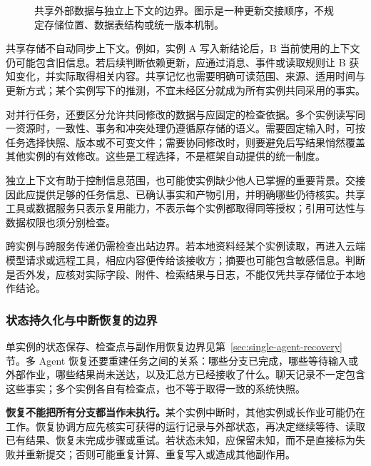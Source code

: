 \documentclass[11pt,a4paper]{article}
\begin{document}
\begin{figure}[H]
\caption{共享外部数据与独立上下文的边界。图示是一种更新交接顺序，不规定存储位置、数据表结构或统一版本机制。}
\label{fig:shared-data-contexts}
\end{figure}

共享存储不自动同步上下文。例如，实例 A 写入新结论后，B 当前使用的上下文仍可能包含旧信息。若后续判断依赖更新，应通过消息、事件或读取规则让 B 获知变化，并实际取得相关内容。共享记忆也需要明确可读范围、来源、适用时间与更新方式；某个实例写下的推测，不宜未经区分就成为所有实例共同采用的事实。


对并行任务，还要区分允许共同修改的数据与应固定的检查依据。多个实例读写同一资源时，一致性、事务和冲突处理仍遵循原存储的语义。需要固定输入时，可按任务选择快照、版本或不可变文件；需要协同修改时，则要避免后写结果悄然覆盖其他实例的有效修改。这些是工程选择，不是框架自动提供的统一制度。

独立上下文有助于控制信息范围，也可能使实例缺少他人已掌握的重要背景。交接因此应提供足够的任务信息、已确认事实和产物引用，并明确哪些仍待核实。共享工具或数据服务只表示复用能力，不表示每个实例都取得同等授权；引用可达性与数据权限也须分别检查。

跨实例与跨服务传递仍需检查出站边界。若本地资料经某个实例读取，再进入云端模型请求或远程工具，相应内容便传给该接收方；摘要也可能包含敏感信息。判断是否外发，应核对实际字段、附件、检索结果与日志，不能仅凭共享存储位于本地作结论。



\subsubsection{状态持久化与中断恢复的边界}
\label{sec:recovery}

单实例的状态保存、检查点与副作用恢复边界见第~\ref{sec:single-agent-recovery} 节。多 Agent 恢复还要重建任务之间的关系：哪些分支已完成，哪些等待输入或外部作业，哪些结果尚未送达，以及汇总方已经接收了什么。聊天记录不一定包含这些事实；多个实例各自有检查点，也不等于取得一致的系统快照。

\textbf{恢复不能把所有分支都当作未执行。}某个实例中断时，其他实例或长作业可能仍在工作。恢复协调方应先核实可获得的运行记录与外部状态，再决定继续等待、读取已有结果、恢复未完成步骤或重试。若状态未知，应保留未知，而不是直接标为失败并重新提交；否则可能重复计算、重复写入或造成其他副作用。
\end{document}
